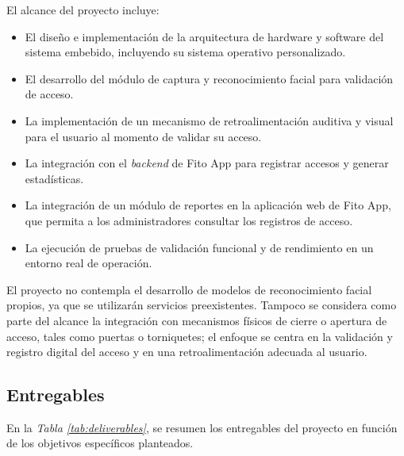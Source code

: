 El alcance del proyecto incluye:
\begin{itemize}
    \item El diseño e implementación de la arquitectura de hardware y software del sistema embebido, incluyendo su sistema operativo personalizado.
    \item El desarrollo del módulo de captura y reconocimiento facial para validación de acceso.
    \item La implementación de un mecanismo de retroalimentación auditiva y visual para el usuario al momento de validar su acceso.
    \item La integración con el \textit{backend} de Fito App para registrar accesos y generar estadísticas.
    \item La integración de un módulo de reportes en la aplicación web de Fito App, que permita a los administradores consultar los registros de acceso.
    \item La ejecución de pruebas de validación funcional y de rendimiento en un entorno real de operación.
\end{itemize}

El proyecto no contempla el desarrollo de modelos de reconocimiento facial propios, ya que se utilizarán servicios preexistentes. Tampoco se considera como parte del alcance la integración con mecanismos físicos de cierre o apertura de acceso, tales como puertas o torniquetes; el enfoque se centra en la validación y registro digital del acceso y en una retroalimentación adecuada al usuario.

\subsection{Entregables}
En la \textit{Tabla \ref{tab:deliverables}}, se resumen los entregables del proyecto en función de los objetivos específicos planteados.


